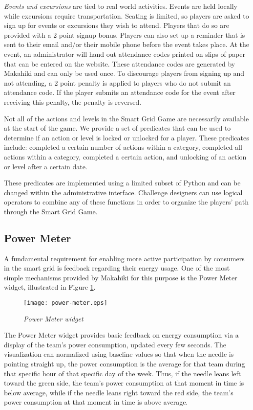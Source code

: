 {\em Events and excursions} are tied to real world activities. Events are held locally while excursions require transportation. Seating is limited, so players are asked to sign up for events or excursions they wish to attend. Players that do so are provided with a 2 point signup bonus. Players can also set up a reminder that is sent to their email and/or their mobile phone before the event takes place. At the event, an administrator will hand out attendance codes printed on slips of paper that can be entered on the website. These attendance codes are generated by Makahiki and can only be used once. To discourage players from signing up and not attending, a 2 point penalty is applied to players who do not submit an attendance code. If the player submits an attendance code for the event after receiving this penalty, the penalty is reversed.

Not all of the actions and levels in the Smart Grid Game are necessarily available at
the start of the game. We provide a set of predicates that can be used to determine if an action or level is locked or unlocked for a player. These predicates include: completed a certain number of actions within a category, completed all actions within a category, completed  a certain action, and unlocking of an action or level after a certain date.

These predicates are implemented using a limited subset of Python and can
be changed within the administrative interface. Challenge designers can use
logical operators to combine any of these functions in order to organize
the players' path through the Smart Grid Game.

\subsection{Power Meter}

A fundamental requirement for enabling more active participation by consumers in the smart grid is feedback regarding their energy usage.  One of the most simple mechanisms provided by Makahiki for this purpose is the Power Meter widget, illustrated in Figure \ref{fig:PowerMeter}.

\begin{figure}[th]
  \center
  \texttt{[image: power-meter.eps]}
  \caption{\em Power Meter widget}
  \label{fig:PowerMeter}
\end{figure}

The Power Meter widget provides basic feedback on energy consumption via a display of the team's power consumption, updated every few seconds.  The visualization can normalized using baseline values so that when the needle is pointing straight up, the power consumption is the average for that team during that specific hour of that specific day of the week.  Thus, if the needle leans left toward the green side, the team's power consumption at that moment in time is below average, while if the needle leans right toward the red side, the team's power consumption at that moment in time is above average.

